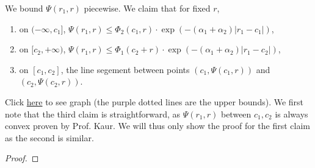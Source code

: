 \documentclass[12pt]{article}
\begin{document}
We bound \(\Psi(r_1,r)\) piecewise. We claim that for fixed \(r\),
\begin{enumerate}
    \item on \((-\infty, c_1]\), \(\Psi(r_1,r) \leq \Phi_2(c_1,r) \cdot \exp(-(\alpha_1 + \alpha_2)|r_1-c_1|)\),
    \item on \([c_2,+\infty)\), \(\Psi(r_1,r) \leq \Phi_1(c_2+r) \cdot \exp(-(\alpha_1 + \alpha_2)|r_1-c_2|)\),
    \item on \([c_1,c_2]\), the line segement between points \((c_1, \Psi(c_1,r))\) and \((c_2, \Psi(c_2,r))\).
\end{enumerate}
Click \href{https://www.desmos.com/calculator/zuqivaujt4}{here} to see graph (the purple dotted lines are the upper bounds).
We first note that the third claim is straightforward, as \(\Psi(r_1,r)\) between \(c_1,c_2\) is always convex proven by Prof. Kaur. We will thus only show the proof for the first claim as the second is similar.

\begin{proof}

\end{proof}
\end{document}
